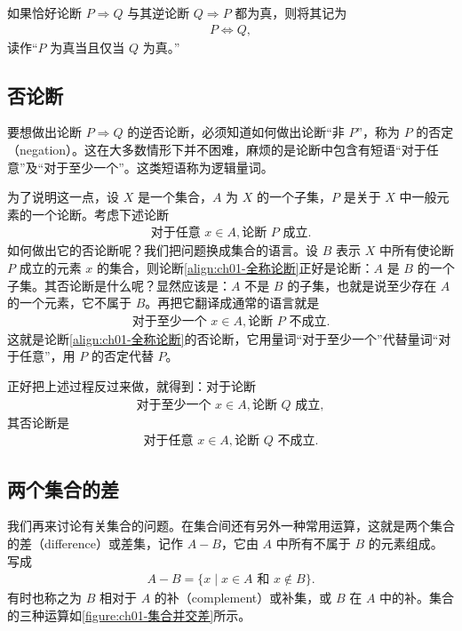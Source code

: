 \documentclass[../../main.tex]{subfiles}
\begin{document}
如果恰好论断 $P \Longrightarrow Q$ 与其逆论断 $Q \Longrightarrow P$ 都为真，则将其记为
\begin{align*}
P \Longleftrightarrow Q,
\end{align*}
读作“$P$ 为真当且仅当 $Q$ 为真。”

\subsection*{否论断}

要想做出论断 $P \Longrightarrow Q$ 的逆否论断，必须知道如何做出论断“非 $P$”，称为 $P$ 的否定（negation）。这在大多数情形下并不困难，麻烦的是论断中包含有短语“对于任意”及“对于至少一个”。这类短语称为逻辑量词。

为了说明这一点，设 $X$ 是一个集合，$A$ 为 $X$ 的一个子集，$P$ 是关于 $X$ 中一般元素的一个论断。考虑下述论断
\begin{align}
\text{对于任意 } x \in A, \text{论断 } P \text{ 成立}.\label{align:ch01-全称论断}
\end{align}
如何做出它的否论断呢？我们把问题换成集合的语言。设 $B$ 表示 $X$ 中所有使论断 $P$ 成立的元素 $x$ 的集合，则论断\eqref{align:ch01-全称论断}正好是论断：$A$ 是 $B$ 的一个子集。其否论断是什么呢？显然应该是：$A$ 不是 $B$ 的子集，也就是说至少存在 $A$ 的一个元素，它不属于 $B$。再把它翻译成通常的语言就是
\begin{align*}
\text{对于至少一个 } x \in A, \text{论断 } P \text{ 不成立}.
\end{align*}
这就是论断\eqref{align:ch01-全称论断}的否论断，它用量词“对于至少一个”代替量词“对于任意”，用 $P$ 的否定代替 $P$。

正好把上述过程反过来做，就得到：对于论断
\begin{align*}
\text{对于至少一个 } x \in A, \text{论断 } Q \text{ 成立},
\end{align*}
其否论断是
\begin{align*}
\text{对于任意 } x \in A, \text{论断 } Q \text{ 不成立}.
\end{align*}

\subsection*{两个集合的差}

我们再来讨论有关集合的问题。在集合间还有另外一种常用运算，这就是两个集合的差（difference）或差集，记作 $A - B$，它由 $A$ 中所有不属于 $B$ 的元素组成。写成
\begin{align}
A - B = \{x \mid x \in A \text{ 和 } x \notin B\}.\label{align:ch01-差定义}
\end{align}
有时也称之为 $B$ 相对于 $A$ 的补（complement）或补集，或 $B$ 在 $A$ 中的补。集合的三种运算如\cref{figure:ch01-集合并交差}所示。
\end{document}
